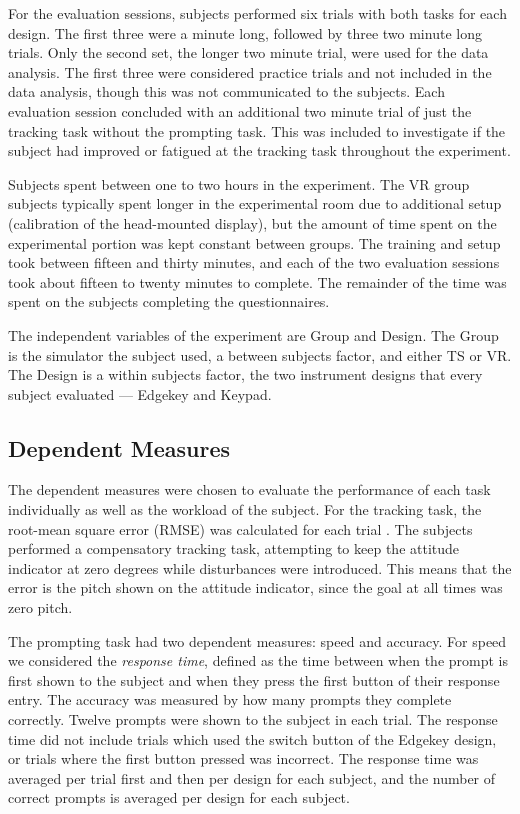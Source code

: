 For the evaluation sessions, subjects performed six trials with both tasks for each design.
The first three were a minute long, followed by three two minute long trials.
Only the second set, the longer two minute trial, were used for the data analysis.
The first three were considered practice trials and not included in the data analysis, though this was not communicated to the subjects.
Each evaluation session concluded with an additional two minute trial of just the tracking task without the prompting task.
This was included to investigate if the subject had improved or fatigued at the tracking task throughout the experiment.

Subjects spent between one to two hours in the experiment.
The VR group subjects typically spent longer in the experimental room due to additional setup (calibration of the head-mounted display), but the amount of time spent on the experimental portion was kept constant between groups.
The training and setup took between fifteen and thirty minutes, and each of the two evaluation sessions took about fifteen to twenty minutes to complete.
The remainder of the time was spent on the subjects completing the questionnaires.

The independent variables of the experiment are Group and Design.
The Group is the simulator the subject used, a between subjects factor, and either TS or VR.
The Design is a within subjects factor, the two instrument designs that every subject evaluated --- Edgekey and Keypad.

\subsection{Dependent Measures}
\label{sec:de_dependent}

The dependent measures were chosen to evaluate the performance of each task individually as well as the workload of the subject.
For the tracking task, the root-mean square error (RMSE) was calculated for each trial \citep{harris_human_2011}.
The subjects performed a compensatory tracking task, attempting to keep the attitude indicator at zero degrees while disturbances were introduced.
This means that the error is the pitch shown on the attitude indicator, since the goal at all times was zero pitch.

The prompting task had two dependent measures: speed and accuracy.
For speed we considered the \textit{response time}, defined as the time between when the prompt is first shown to the subject and when they press the first button of their response entry.
The accuracy was measured by how many prompts they complete correctly.
Twelve prompts were shown to the subject in each trial.
The response time did not include trials which used the switch button of the Edgekey design, or trials where the first button pressed was incorrect.
The response time was averaged per trial first and then per design for each subject, and the number of correct prompts is averaged per design for each subject.

